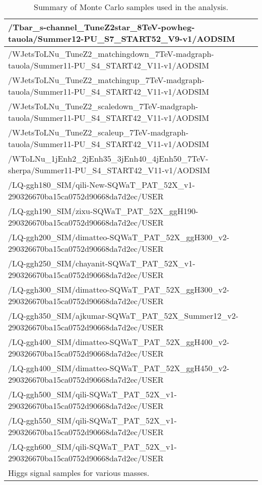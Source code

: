 \begin{sidewaystable}[htb]
\begin{center}
\begin{tabular}{|l|}
      /Tbar\_s-channel\_TuneZ2star\_8TeV-powheg-tauola/Summer12-PU\_S7\_START52\_V9-v1/AODSIM   \\
      \hline
      /WJetsToLNu\_TuneZ2\_matchingdown\_7TeV-madgraph-tauola/Summer11-PU\_S4\_START42\_V11-v1/AODSIM  \\
      /WJetsToLNu\_TuneZ2\_matchingup\_7TeV-madgraph-tauola/Summer11-PU\_S4\_START42\_V11-v1/AODSIM  \\
      /WJetsToLNu\_TuneZ2\_scaledown\_7TeV-madgraph-tauola/Summer11-PU\_S4\_START42\_V11-v1/AODSIM          \\
      /WJetsToLNu\_TuneZ2\_scaleup\_7TeV-madgraph-tauola/Summer11-PU\_S4\_START42\_V11-v1/AODSIM            \\
      /WToLNu\_1jEnh2\_2jEnh35\_3jEnh40\_4jEnh50\_7TeV-sherpa/Summer11-PU\_S4\_START42\_V11-v1/AODSIM      \\
      \hline 
      /LQ-ggh180\_SIM/qili-New-SQWaT\_PAT\_52X\_v1-290326670ba15ca0752d90668da7d2ec/USER   \\
      /LQ-ggh190\_SIM/zixu-SQWaT\_PAT\_52X\_ggH190-290326670ba15ca0752d90668da7d2ec/USER \\
      /LQ-ggh200\_SIM/dimatteo-SQWaT\_PAT\_52X\_ggH300\_v2-290326670ba15ca0752d90668da7d2ec/USER   \\	
      /LQ-ggh250\_SIM/chayanit-SQWaT\_PAT\_52X\_v1-290326670ba15ca0752d90668da7d2ec/USER \\
      /LQ-ggh300\_SIM/dimatteo-SQWaT\_PAT\_52X\_ggH300\_v2-290326670ba15ca0752d90668da7d2ec/USER  \\ 
      /LQ-ggh350\_SIM/ajkumar-SQWaT\_PAT\_52X\_Summer12\_v2-290326670ba15ca0752d90668da7d2ec/USER \\
      /LQ-ggh400\_SIM/dimatteo-SQWaT\_PAT\_52X\_ggH400\_v2-290326670ba15ca0752d90668da7d2ec/USER  \\
      /LQ-ggh400\_SIM/dimatteo-SQWaT\_PAT\_52X\_ggH450\_v2-290326670ba15ca0752d90668da7d2ec/USER   \\
      /LQ-ggh500\_SIM/qili-SQWaT\_PAT\_52X\_v1-290326670ba15ca0752d90668da7d2ec/USER   \\
      /LQ-ggh550\_SIM/qili-SQWaT\_PAT\_52X\_v1-290326670ba15ca0752d90668da7d2ec/USER   \\
      /LQ-ggh600\_SIM/qili-SQWaT\_PAT\_52X\_v1-290326670ba15ca0752d90668da7d2ec/USER   \\
     Higgs signal samples for various masses.  \\
      \hline
    \end{tabular}
  \end{center}
  \caption{Summary of Monte Carlo samples used in the analysis.}
  \label{tab:MCsamples}
\end{sidewaystable}

